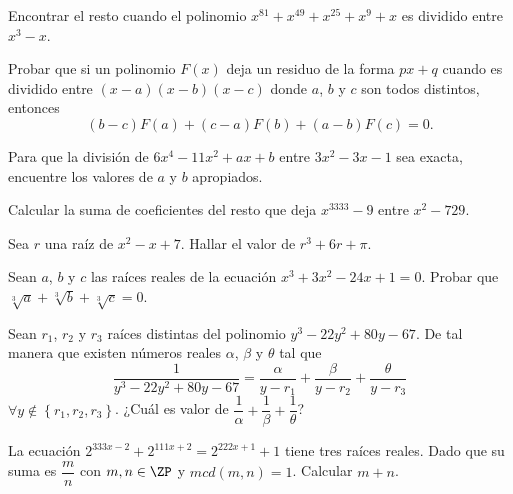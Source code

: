 \begin{section-problem}
    Encontrar el resto cuando el polinomio $x^{81} + x^{49} + x^{25} + x^9 + x$ es dividido entre $x^3 - x$.
\end{section-problem}

\begin{section-problem}
    Probar que si un polinomio $F(x)$ deja un residuo de la forma $px + q$ cuando es dividido entre $(x - a)(x - b)(x - c)$
    donde $a$, $b$ y $c$ son todos distintos, entonces
    \[(b - c)F(a) + (c - a)F(b) + (a - b)F(c) = 0.\]
\end{section-problem}

\begin{section-problem}
    Para que la división de $6x^4 - 11x^2 + ax + b$ entre $3x^2 - 3x - 1$ sea exacta, encuentre los valores de $a$ y $b$ apropiados.
\end{section-problem}

\begin{section-problem}
    Calcular la suma de coeficientes del resto que deja $x^{3333} - 9$ entre $x^2 - 729$.
\end{section-problem}

\begin{section-problem}
    Sea $r$ una raíz de $x^2 - x + 7$.
    Hallar el valor de $r^3 + 6r + \pi$.
\end{section-problem}

\begin{section-problem}
    Sean $a$, $b$ y $c$ las raíces reales de la ecuación $x^3 + 3x^2 - 24x + 1 = 0$.
    Probar que $\sqrt[3]{a} + \sqrt[3]{b} + \sqrt[3]{c} = 0$.
\end{section-problem}

\begin{section-problem}
    Sean $r_1$, $r_2$ y $r_3$ raíces distintas del polinomio $y^3 - 22 y^2 + 80 y - 67$.
    De tal manera que existen números reales $\alpha$, $\beta$ y $\theta$ tal que
    \[
        \frac{1}{y^3 - 22 y^2 + 80 y - 67} = \frac{\alpha}{y - r_1} + \frac{\beta}{y - r_2} + \frac{\theta}{y - r_3}
    \]
    $\forall y \notin \left\{ r_1, r_2, r_3 \right\}$.
    ¿Cuál es valor de $\dfrac{1}{\alpha} + \dfrac{1}{\beta} + \dfrac{1}{\theta}$?
\end{section-problem}

\begin{section-problem}
    La ecuación $2^{333x - 2} + 2^{111x + 2} = 2^{222x + 1} + 1$ tiene tres raíces reales.
    Dado que su suma es $\dfrac{m}{n}$ con $m, n \in \ZP$ y $mcd(m, n) = 1$.
    Calcular $m + n$.
\end{section-problem}

